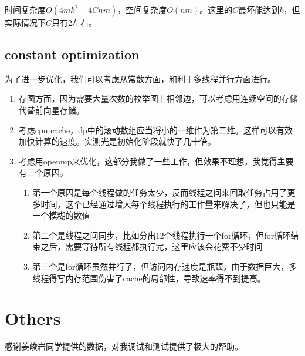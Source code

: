 \documentclass[a4paper, 11pt, nofonts, nocap, fancyhdr]{ctexart}
\begin{document}
时间复杂度$O(4mk^{2}+4Cnm)$，空间复杂度$O(nm)$。这里的$C$最坏能达到$k$，但实际情况下$C$只有2左右。

\subsection{constant optimization}

为了进一步优化，我们可以考虑从常数方面，和利于多线程并行方面进行。
\begin{enumerate}
\item 存图方面，因为需要大量次数的枚举图上相邻边，可以考虑用连续空间的存储代替前向星存储。
\item 考虑cpu cache，dp中的滚动数组应当将小的一维作为第二维。这样可以有效加快计算的速度。实测光是初始化阶段就快了几十倍。
\item 考虑用openmp来优化，这部分我做了一些工作，但效果不理想，我觉得主要有三个原因。
\begin{enumerate}
	\item 第一个原因是每个线程做的任务太少，反而线程之间来回取任务占用了更多时间，这个已经通过增大每个线程执行的工作量来解决了，但也只能是一个模糊的数值
	\item 第二个是线程之间同步，比如分出12个线程执行一个for循环，但for循环结束之后，需要等待所有线程都执行完，这里应该会花费不少时间
	\item 第三个是for循环虽然并行了，但访问内存速度是瓶颈，由于数据巨大，多线程得写内存范围伤害了cache的局部性，导致速率得不到提高。
\end{enumerate}
\end{enumerate}

\section{Others}

感谢姜峻岩同学提供的数据，对我调试和测试提供了极大的帮助。
\end{document}
